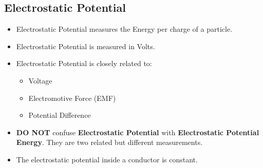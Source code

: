 \documentclass[letterpaper, 12pt]{article}
\begin{document}
\subsection*{Electrostatic Potential}
\begin{itemize}
\item Electrostatic Potential measures the Energy per charge of a particle.
\item Electrostatic Potential is measured in Volts.
\item Electrostatic Potential is closely related to:
	\begin{itemize}
		\item Voltage
		\item Electromotive Force (EMF)
		\item Potential Difference
	\end{itemize}
\item \textbf{DO NOT} confuse \textbf{Electrostatic Potential} with \textbf{Electrostatic Potential Energy}.  They are two related but different measurements. 
\item The electrostatic potential inside a conductor is constant. 
\end{itemize}

 
\end{document}
